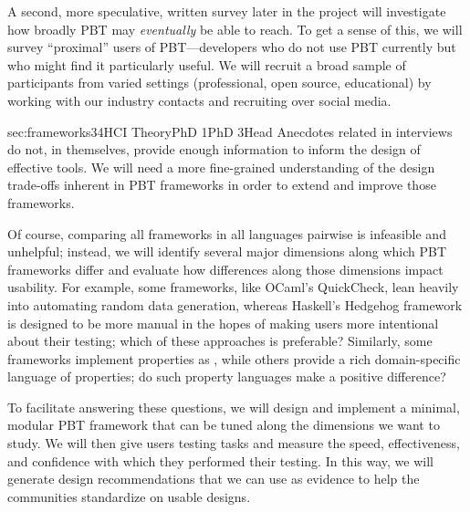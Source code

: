 A second, more speculative, written survey later in the project will investigate
how broadly PBT may {\em eventually} be able to reach.  To get a sense
of this, we will
survey ``proximal'' users of PBT---developers who do not use PBT
currently but who might find it particularly
useful.
We
will recruit a broad sample of participants from varied settings
(professional, open source, educational) by working with our industry contacts
and recruiting over social media.
%
\iflater {} \fi

%
  {sec:frameworks}{3}{4}{HCI Theory}{PhD
1}{PhD 3}{Head}
%
Anecdotes related in interviews do not, in themselves, provide enough
information to inform the design of effective tools.  We will need a more
fine-grained understanding of the design trade-offs inherent in PBT frameworks
in order to extend and improve those frameworks.

Of course, comparing all frameworks in all languages pairwise is
infeasible and unhelpful; instead, we will identify several major dimensions along which PBT
frameworks differ and evaluate how differences along those dimensions impact
usability. For example, some frameworks, like OCaml's QuickCheck, lean heavily
into automating random data generation, whereas Haskell's Hedgehog framework is designed
to be more manual in the hopes of making users more intentional about their
testing; which of these approaches is preferable? Similarly, some frameworks
implement properties as , while others provide
a rich domain-specific language of properties; do such property
languages make a positive difference?

To facilitate answering these questions, we will design and implement a minimal,
modular PBT framework that can be tuned along the dimensions we want
to study. \iflater{}\fi
We will then give users testing tasks and measure the speed, effectiveness, and
confidence with which they performed their testing. In this way, we will
generate design recommendations that we can use as evidence to help the
communities standardize on usable designs.


